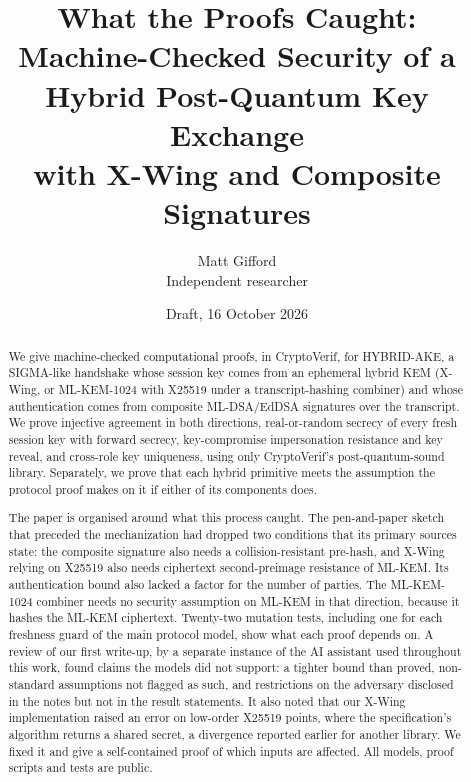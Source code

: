 \documentclass[11pt,a4paper]{article}
\title{What the Proofs Caught:\\[2pt]
\large Machine-Checked Security of a Hybrid Post-Quantum Key Exchange\\
with X-Wing and Composite Signatures}
\author{Matt Gifford\\[2pt]
\small Independent researcher}
\date{Draft, 16 October 2026}
\theoremstyle{plain}
\theoremstyle{definition}
\theoremstyle{remark}
\begin{document}
\maketitle

\begin{abstract}
\noindent
We give machine-checked computational proofs, in CryptoVerif, for
HYBRID-AKE, a SIGMA-like handshake whose session key comes from an
ephemeral hybrid KEM (X-Wing, or ML-KEM-1024 with X25519 under a
transcript-hashing combiner) and whose authentication comes from composite
ML-DSA/EdDSA signatures over the transcript. We prove injective agreement in
both directions, real-or-random secrecy of every fresh session key with
forward secrecy, key-compromise impersonation resistance and key reveal, and
cross-role key uniqueness, using only CryptoVerif's post-quantum-sound
library. Separately, we prove that each hybrid primitive meets the
assumption the protocol proof makes on it if either of its components does.

The paper is organised around what this process caught. The pen-and-paper
sketch that preceded the mechanization had dropped two conditions that its
primary sources state: the composite signature also needs a
collision-resistant pre-hash, and X-Wing relying on X25519 also needs
ciphertext second-preimage resistance of ML-KEM. Its authentication bound
also lacked a factor for the number of parties. The ML-KEM-1024 combiner
needs no security assumption on ML-KEM in that direction, because it hashes
the ML-KEM ciphertext. Twenty-two mutation tests, including one for each
freshness guard of the main protocol model, show what each proof depends
on. A review of our first
write-up, by a separate instance of the AI assistant used throughout this
work, found claims the models did not support: a tighter bound than proved,
non-standard assumptions not flagged as such, and restrictions on the
adversary disclosed in the notes but not in the result statements. It also noted that our
X-Wing implementation raised an error on low-order X25519 points, where the
specification's algorithm returns a shared secret, a divergence reported
earlier for another library. We fixed it and give a self-contained proof of
which inputs are affected. All models, proof scripts and tests are public.
\end{abstract}














\appendix

\end{document}
